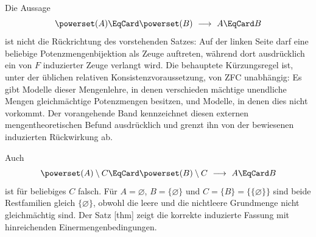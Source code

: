 \documentclass[main.tex]{subfiles}
\begin{document}
\begin{tabproofwide}
\end{tabproofwide}

\begin{remark}
Die Aussage
\[
  \powerset(A)\EqCard\powerset(B)\ \longrightarrow\ A\EqCard B
\]
ist nicht die Rückrichtung des vorstehenden Satzes: Auf der linken Seite
darf eine beliebige Potenzmengenbijektion als Zeuge auftreten, während dort
ausdrücklich ein von \(F\) induzierter Zeuge verlangt wird.  Die behauptete
Kürzungsregel ist, unter der üblichen relativen Konsistenzvoraussetzung, von
ZFC unabhängig: Es gibt Modelle dieser Mengenlehre, in denen verschieden
mächtige unendliche Mengen gleichmächtige Potenzmengen besitzen, und Modelle,
in denen dies nicht vorkommt.  Der vorangehende Band kennzeichnet diesen
externen mengentheoretischen Befund ausdrücklich und grenzt ihn von der
bewiesenen induzierten Rückwirkung ab.

Auch
\[
  \powerset(A)\setminus C\EqCard\powerset(B)\setminus C
  \ \longrightarrow\ A\EqCard B
\]
ist für beliebiges \(C\) falsch.  Für
\(A=\varnothing\), \(B=\{\varnothing\}\) und
\(C=\{B\}=\{\{\varnothing\}\}\) sind beide Restfamilien gleich
\(\{\varnothing\}\), obwohl die leere und die nichtleere Grundmenge nicht
gleichmächtig sind.  Der Satz
[thm] zeigt die korrekte
induzierte Fassung mit hinreichenden Einermengenbedingungen.
\end{remark}
\end{document}
